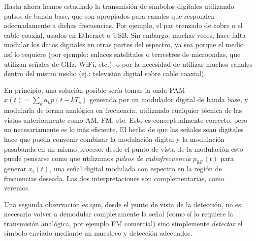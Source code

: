 Hasta ahora hemos estudiado la transmisión de símbolos digitales utilizando pulsos de banda base, que son apropiados para canales que responden adecuadamente a dichas frecuencias. Por ejemplo, el par trenzado de cobre o el cable coaxial, usados en Ethernet o USB. Sin embargo, muchas veces, hace falta modular los datos digitales en otras partes del espectro, ya sea porque el medio así lo requiere (por ejemplo: enlaces satelitales o terrestres de microondas, que utilizan señales de $\unit{\giga\hertz}$, WiFi, etc.), o por la necesidad de utilizar muchos canales dentro del mismo medio (ej.: televisión digital sobre cable coaxial).

En principio, una solución posible sería tomar la onda PAM $x(t)=\sum_k a_k p(t-kT_s)$ generada por un modulador digital de banda base, y modularla de forma analógica en frecuencia, utilizando cualquier técnica de las vistas anteriormente como AM, FM, etc. Esto es conceptualmente correcto, pero no necesariamente es lo más eficiente. El hecho de que las señales sean digitales hace que pueda convenir combinar la modulación digital y la modulación pasabanda en un mismo proceso: desde el punto de vista de la modulación esto puede pensarse como que utilizamos \emph{pulsos de radiofrecuencia} $p_{\textrm{RF}}(t)$ para generar $x_{c}(t)$, una señal digital modulada con espectro en la región de frecuencias deseada. Las dos interpretaciones son complementarias, como veremos.

Una segunda observación es que, desde el punto de vista de la detección, no es necesario volver a demodular completamente la señal (como sí lo requiere la transmisión analógica, por ejemplo FM comercial) sino simplemente \emph{detectar} el símbolo enviado mediante un muestreo y detección adecuados.

